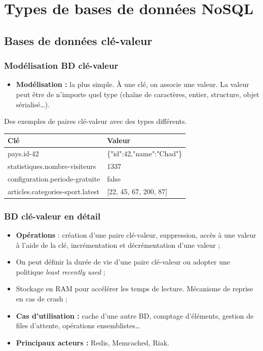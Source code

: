 \section{Types de bases de données NoSQL}

	\subsection{Bases de données clé-valeur}
	\begin{frame}
		\frametitle{Modélisation BD clé-valeur}

		\begin{itemize}
			\item \textbf{Modélisation :} la plus simple. À une clé, on associe une valeur. La valeur peut être de n'importe quel type (chaîne de caractères, entier, structure, objet sérialisé\dots).
		\end{itemize}

		\vspace{15px}
		Des exemples de paires clé-valeur avec des types différents.
		\vspace{5px}
		\begin{tabular}{|l|l|}
			\hline
			\textbf{Clé} & \textbf{Valeur} \\ \hline\hline
			pays.id-42 & \{"id":42,"name":"Chad"\} \\ \hline
			statistiques.nombre-visiteurs & 1337 \\ \hline
			configuration.periode-gratuite & false \\ \hline
			articles.categories-sport.latest & [22, 45, 67, 200, 87] \\ \hline
		\end{tabular}
	\end{frame}

	\begin{frame}
		\frametitle{BD clé-valeur en détail}
		\begin{itemize}
			\item \textbf{Opérations} : création d'une paire clé-valeur, suppression, accès à une valeur à l'aide de la clé, incrémentation et décrémentation d'une valeur ;
			\item On peut définir la durée de vie d'une paire clé-valeur ou adopter une politique \textit{least recently used} ;
			\item Stockage en RAM pour accélérer les temps de lecture. Mécanisme de reprise en cas de crash ;
			\item \textbf{Cas d'utilisation :} cache d'une autre BD, comptage d'éléments, gestion de files d'attente, opérations ensemblistes\dots
			\item \textbf{Principaux acteurs :} Redis, Memcached, Riak.
		\end{itemize}
	\end{frame}

